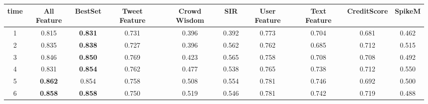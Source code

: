 \begin{table}[]
\centering
\begin{tabular}{|c|ccccccccc|}
\hline
time & \multicolumn{1}{c|}{\tiny{All Feature}} & \multicolumn{1}{c|}{\footnotesize{BestSet}} & \multicolumn{1}{c|}{\tiny{Tweet Feature}} & \multicolumn{1}{c|}{\tiny{Crowd Wisdom}} & \multicolumn{1}{c|}{\footnotesize {SIR}} & \multicolumn{1}{c|}{\tiny{User Feature}} & \multicolumn{1}{c|}{\tiny{Text Feature}} & \multicolumn{1}{c|}{\footnotesize{CreditScore}} & \multicolumn{1}{c|}{\footnotesize{SpikeM}} \\ \hline
1    & 0.815                            & \textbf{0.831}               & 0.731                              & 0.396                             & 0.392                    & 0.773                             & 0.704                             & 0.681                            & 0.462                       \\ \cline{1-1}
2    & 0.835                            & \textbf{0.838}               & 0.727                              & 0.396                             & 0.562                    & 0.762                             & 0.685                             & 0.712                            & 0.515                       \\ \cline{1-1}
3    & 0.846                            & \textbf{0.850}               & 0.769                              & 0.423                             & 0.565                    & 0.758                             & 0.708                             & 0.708                            & 0.492                       \\ \cline{1-1}
4    & 0.831                            & \textbf{0.854}               & 0.762                              & 0.477                             & 0.538                    & 0.765                             & 0.738                             & 0.712                            & 0.550                       \\ \cline{1-1}
5    & \textbf{0.862}                   & 0.854                        & 0.758                              & 0.508                             & 0.554                    & 0.781                             & 0.746                             & 0.692                            & 0.500                       \\ \cline{1-1}
6    & \textbf{0.858}                   & \textbf{0.858}               & 0.750                              & 0.519                             & 0.546                    & 0.781                             & 0.742                             & 0.719                            & 0.488                       \\ \hline

\end{tabular}
\end{table}
